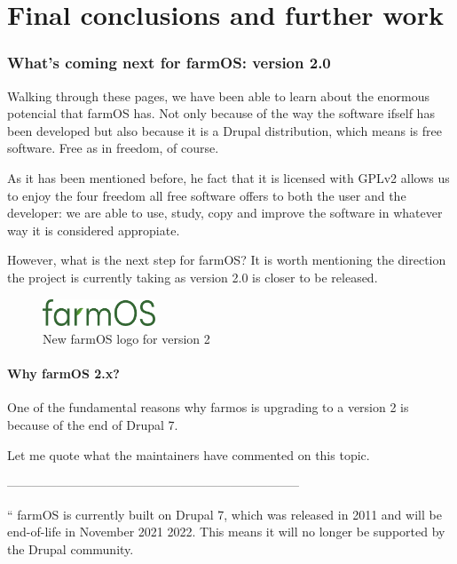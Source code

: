 \chapter{Final conclusions and further work}\label{cap:conclusiones}

\subsection{What's coming next for farmOS: version 2.0}
Walking through these pages, we have been able to learn about the enormous potencial that farmOS has. Not only because of the way the software ifself has been developed but also because it is a Drupal distribution, which means is free software. Free as in freedom, of course.

As it has been mentioned before, he fact that it is licensed with GPLv2 allows us to enjoy the four freedom all free software offers to both the user and the developer: we are able to use, study, copy and improve the software in whatever way it is considered appropiate.

However, what is the next step for farmOS? It is worth mentioning the direction the project is currently taking as version 2.0 is closer to be released.

\vspace{3mm}

\begin{figure}[H]
    \centering
    \includegraphics[width=0.3\textwidth]{fig/new-farmos.png}
    \caption{New farmOS logo for version 2}
    \label{fig:new-farmos}
\end{figure}

\vspace{3mm}

\subsubsection{Why farmOS 2.x?}
One of the fundamental reasons why farmos is upgrading to a version 2 is because of the end of Drupal 7.

Let me quote what the maintainers have commented on this topic\cite{end-of-d7}.

\vspace{3mm}
-----------------------------------------------------------------------

`` farmOS is currently built on Drupal 7, which was released in 2011 and will be end-of-life in November 2021 2022. This means it will no longer be supported by the Drupal community.

